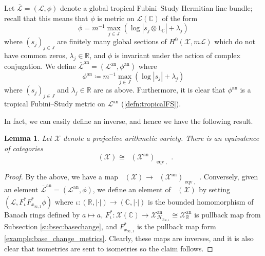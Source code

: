 \documentclass[11pt,reqno]{amsart}
\newcommand{\mR}{\mathbb{R}}
\newcommand{\mC}{\mathbb{C}}
\newcommand{\cX}{\mathcal{X}}
\newcommand{\cL}{\mathcal{L}}
\newcommand{\sH}{{\mathscr H}}
\theoremstyle{theorem}
\numberwithin{equation}{subsection}
\newtheorem{lemma}[subsubsection]{Lemma}
\numberwithin{equation}{subsection}
\theoremstyle{definition}
\theoremstyle{remark}
\numberwithin{equation}{subsubsection} \numberwithin{figure}{section}
\DeclareMathOperator{\an}{an}
\DeclareMathOperator{\aPic}{\widehat{Pic}}
\DeclareMathOperator{\acPic}{\widehat{\underline{Pic}}}
\DeclareMathOperator{\tFS}{FS^{\tau}}
\DeclareMathOperator{\gtFS}{g.FS^{\tau}}
\DeclareMathOperator{\eqv}{eqv}
\begin{document}
Let $\overline{\cL} = (\cL,\phi)$ denote a global tropical Fubini--Study Hermitian line bundle; recall that this means that $\phi$ is metric on $\cL(\mC)$ of the form
\[
\phi = m^{-1}\max_{j\in J} (\log |s_{j}\otimes 1_{\mC}| + \lambda_{j})
\]
where $(s_{j})_{j\in J}$ are finitely many global sections of $H^0(\cX,m\cL)$ which do not have common zeros, $\lambda_{j} \in \mR$, and $\phi$ is invariant under the action of complex conjugation. 
We define $\overline{\cL}^{\an} = (\cL^{\an},\phi^{\an})$ where 
\[
\phi^{\an}\coloneqq m^{-1}\max_{j\in J} (\log |s_{j}| + \lambda_{j})
\]
where $(s_{j})_{j\in J}$ and $\lambda_{j} \in \mR$ are as above. 
Furthermore, it is clear that $\phi^{\an}$ is a tropical Fubini--Study metric on $\cL^{\an}$ (\autoref{defn:tropicalFS}). 


In fact, we can easily define an inverse, and hence we have the following result. 

\begin{lemma}\label{lemma:equivGTFS}
Let $\cX$ denote a projective arithmetic variety. 
There is an equivalence of categories
\[
\acPic(\cX)_{\gtFS} \cong \acPic(\cX^{\an})_{\eqv, \tFS}. 
\]
\end{lemma}

\begin{proof}
By the above, we have a map $\aPic(\cX)_{\gtFS} \to \aPic(\cX^{\an})_{\eqv, \tFS}$. 
Conversely, given an element $\overline{\cL}^{\an} = (\cL^{\an},\phi)$, we define an element of $\aPic(\cX)_{\gtFS}$ by setting $(\cL,F_{\iota}^*F_{x_{\infty,1}}^*\phi)$ where $\iota\colon (\mR,|\cdot|) \to (\mC,|\cdot|)$ is the bounded homomorphism of Banach rings defined by $a\mapsto a$, $F_{\iota}^*\colon \cX(\mC) \to \cX_{\sH_{x_{\infty,1}}}^{\an}\cong \cX_{\mR}^{\an}$ is pullback map from Subsection \ref{subsec:basechange}, and $F_{x_{\infty,1}}^*$ is the pullback map form \autoref{example:base_change_metrics}. 
Clearly, these maps are inverses, and it is also clear that isometries are sent to isometries so the claim follows. 
\end{proof}

%
%
\end{document}
